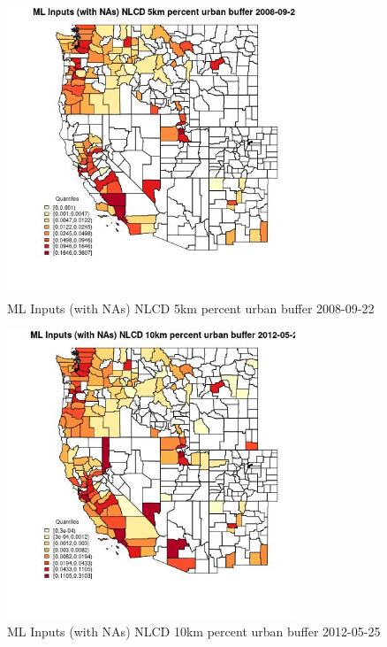 \begin{figure} 
\centering  
\includegraphics[width=0.77\textwidth]{Code_Outputs/Report_ML_input_PM25_Step4_part_e_de_duplicated_aves_compiled_2019-05-18wNAs_CountyNLCD_5km_percent_urban_bufferMean2008-09-22_2008-09-22.jpg} 
\caption{\label{fig:Report_ML_input_PM25_Step4_part_e_de_duplicated_aves_compiled_2019-05-18wNAsCountyNLCD_5km_percent_urban_bufferMean2008-09-22_2008-09-22}ML Inputs (with NAs) NLCD 5km percent urban buffer 2008-09-22} 
\end{figure} 
 

\begin{figure} 
\centering  
\includegraphics[width=0.77\textwidth]{Code_Outputs/Report_ML_input_PM25_Step4_part_e_de_duplicated_aves_compiled_2019-05-18wNAs_CountyNLCD_10km_percent_urban_bufferMean2012-05-25_2012-05-25.jpg} 
\caption{\label{fig:Report_ML_input_PM25_Step4_part_e_de_duplicated_aves_compiled_2019-05-18wNAsCountyNLCD_10km_percent_urban_bufferMean2012-05-25_2012-05-25}ML Inputs (with NAs) NLCD 10km percent urban buffer 2012-05-25} 
\end{figure} 
 

